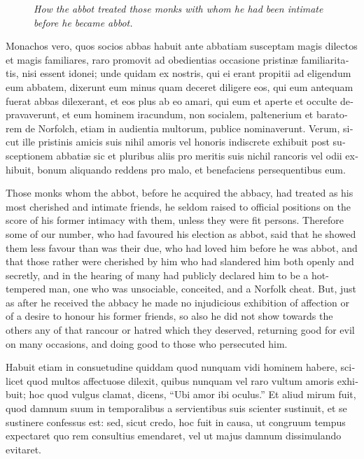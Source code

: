 \documentclass[10pt]{book}
\newcommand{\blockhead}[4][]{
\begin{figure}
\centering
\vspace{#4}
\parbox{2.75cm}{\begin{center}\footnotesize \color{BrickRed} \emph{#2}\\ #1 \end{center}}
\end{figure}
}
\begin{document}
\begin{paracol}{2}
\switchcolumn*

\begin{otherlanguage}{latin}
\blockhead{How the abbot treated those monks with whom he had been intimate before he became abbot.}{4}{-0.65cm}
Monachos vero, quos socios abbas habuit ante abbatiam susceptam magis dilectos et magis familiares, raro promovit ad obedientias occasione pristin\ae{} familiaritatis, nisi essent idonei; unde quidam ex nostris, qui ei erant propitii ad eligendum eum abbatem, dixerunt eum minus quam deceret diligere eos, qui eum antequam fuerat abbas dilexerant, et eos plus ab eo amari, qui eum et aperte et occulte depravaverunt, et eum hominem iracundum, non socialem, paltenerium et baratorem de Norfolch, etiam in audientia multorum, publice nominaverunt. Verum, sicut ille pristinis amicis suis nihil amoris vel honoris indiscrete exhibuit post susceptionem abbati\ae{} sic et pluribus aliis pro meritis suis nichil rancoris vel odii exhibuit, bonum aliquando reddens pro malo, et benefaciens persequentibus eum.

\end{otherlanguage}

\switchcolumn

Those monks whom the abbot, before he acquired the abbacy, had treated as his most cherished and intimate friends, he seldom raised to official positions on the score of his former intimacy with them, unless they were fit persons. Therefore some of our number, who had favoured his election as abbot, said that he showed them less favour than was their due, who had loved him before he was abbot, and that those rather were cherished by him who had slandered him both openly and secretly, and in the hearing of many had publicly declared him to be a hot-tempered man, one who was unsociable, conceited, and a Norfolk cheat. But, just as after he received the abbacy he made no injudicious exhibition of affection or of a desire to honour his former friends, so also he did not show towards the others any of that rancour or hatred which they deserved, returning good for evil on many occasions, and doing good to those who persecuted him.

\switchcolumn*

\begin{otherlanguage}{latin}
Habuit etiam in consuetudine quiddam quod nunquam vidi hominem habere, scilicet quod multos affectuose dilexit, quibus nunquam vel raro vultum amoris exhibuit; hoc quod vulgus clamat, dicens, ``Ubi amor ibi oculus.'' Et aliud mirum fuit, quod damnum suum in temporalibus a servientibus suis scienter sustinuit, et se sustinere confessus est: sed, sicut credo, hoc fuit in causa, ut congruum tempus expectaret quo rem consultius emendaret, vel ut majus damnum dissimulando evitaret.
\end{otherlanguage}


\end{paracol}
\end{document}
